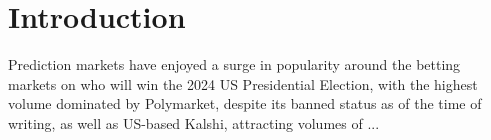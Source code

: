 \section{Introduction}

Prediction markets have enjoyed a surge in popularity around the betting
markets on who will win the 2024 US Presidential Election, with the highest
volume dominated by Polymarket, despite its banned status as of the time of writing,
as well as US-based Kalshi, attracting volumes of ... %
